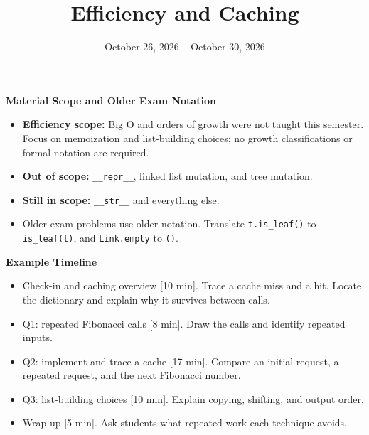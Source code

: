 \documentclass{exam}
\title{Efficiency and Caching}
\date{October 26, 2026 -- October 30, 2026}
\begin{document}
\maketitle

\begin{meta}
\small
\textbf{Material Scope and Older Exam Notation}
\begin{itemize}
    \item \textbf{Efficiency scope:} Big O and orders of growth were not taught this semester. Focus on memoization and list-building choices; no growth classifications or formal notation are required.
    \item \textbf{Out of scope:} \lstinline{__repr__}, linked list mutation, and tree mutation.
    \item \textbf{Still in scope:} \lstinline{__str__} and everything else.
    \item Older exam problems use older notation. Translate \lstinline{t.is_leaf()} to \lstinline{is_leaf(t)}, and \lstinline{Link.empty} to \lstinline{()}.
\end{itemize}

\textbf{Example Timeline}
\begin{itemize}
    \item Check-in and caching overview [10 min]. Trace a cache miss and a hit. Locate the dictionary and explain why it survives between calls.
    \item Q1: repeated Fibonacci calls [8 min]. Draw the calls and identify repeated inputs.
    \item Q2: implement and trace a cache [17 min]. Compare an initial request, a repeated request, and the next Fibonacci number.
    \item Q3: list-building choices [10 min]. Explain copying, shifting, and output order.
    \item Wrap-up [5 min]. Ask students what repeated work each technique avoids.
\end{itemize}


\end{meta}
\end{document}

